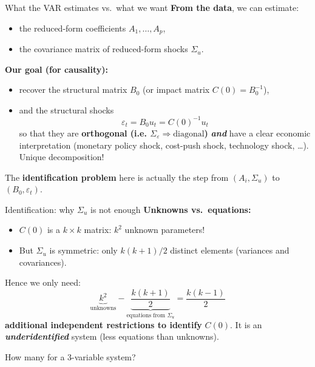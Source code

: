 \documentclass{beamer}
\begin{document}
\begin{frame}{What the VAR estimates vs.\ what we want}
\small
\textbf{From the data}, we can estimate:
\begin{itemize}
  \item the reduced-form coefficients $A_1,\dots,A_p$,
  \item the covariance matrix of reduced-form shocks $\Sigma_u$.
\end{itemize}

\medskip
\textbf{Our goal (for causality):}
\begin{itemize}
  \item recover the structural matrix $B_0$ (or impact matrix $C(0) = B_0^{-1}$),
  \item and the structural shocks
  \[
  \varepsilon_t = B_0 u_t = C(0)^{-1} u_t
  \]
so that they are \textbf{orthogonal (i.e. $\Sigma_\varepsilon \Rightarrow \text{diagonal}$)} \textbf{\textit{and}} have a clear economic interpretation (monetary policy shock, cost-push shock, technology shock, \dots). Unique decomposition!
\end{itemize}

\medskip
The \textbf{identification problem} here is actually the step from $(A_i,\Sigma_u)$ to $(B_0,\varepsilon_t)$.
\end{frame}


\begin{frame}{Identification: why $\Sigma_u$ is not enough}
\textbf{Unknowns vs.\ equations:}
\begin{itemize}
  \item $C(0)$ is a $k\times k$ matrix: $k^2$ unknown parameters!
  \item But $\Sigma_u$ is symmetric: only $k(k+1)/2$ distinct elements (variances and covariances).
\end{itemize}

\medskip
Hence we only need:
\[
\underbrace{k^2}_{\text{unknowns}} - \underbrace{\frac{k(k+1)}{2}}_{\text{equations from }\Sigma_u}
= \frac{k(k-1)}{2}
\]
\textbf{additional independent restrictions to identify} $C(0)$. It is an \textit{\textbf{underidentified}} system (less equations than unknowns). 

How many for a 3-variable system?
\end{frame}
\end{document}
